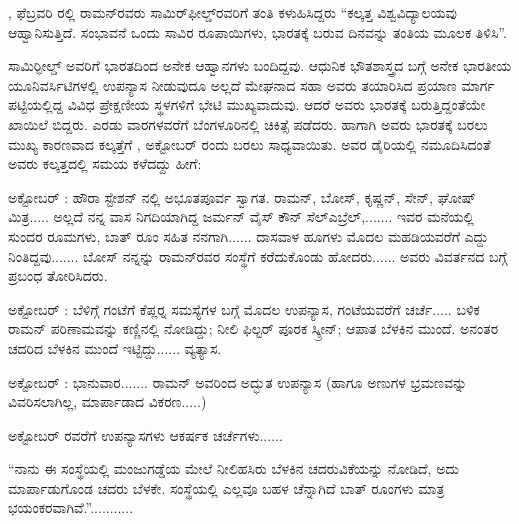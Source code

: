\vskip 2.5pt

, ಫೆಬ್ರವರಿ ರಲ್ಲಿ ರಾಮನ್‍ರವರು ಸಾಮಿರ್‌ಫೀಲ್ಡ್‌ರವರಿಗೆ ತಂತಿ ಕಳುಹಿಸಿದ್ದರು\enginline{-} “ಕಲ್ಕತ್ತ ವಿಶ್ವವಿದ್ಯಾಲಯವು ಆಹ್ವಾನಿಸುತ್ತಿದೆ. ಸಂಭಾವನೆ ಒಂದು ಸಾವಿರ ರೂಪಾಯಿಗಳು, ಭಾರತಕ್ಕೆ ಬರುವ ದಿನವನ್ನು ತಂತಿಯ ಮೂಲಕ ತಿಳಿಸಿ”.

\vskip 2.5pt

ಸಾಮಿರ್‍ಫೀಲ್ಡ್ ಅವರಿಗೆ ಭಾರತದಿಂದ ಅನೇಕ ಆಹ್ವಾನಗಳು ಬಂದಿದ್ದವು. ಆಧುನಿಕ ಭೌತಶಾಸ್ತ್ರದ ಬಗ್ಗೆ ಅನೇಕ ಭಾರತೀಯ ಯೂನಿವರ್ಸಿಟಿಗಳಲ್ಲಿ ಉಪನ್ಯಾಸ ನೀಡುವುದೂ ಅಲ್ಲದೆ ಮೇಘನಾದ ಸಹಾ ಅವರು ತಯಾರಿಸಿದ ಪ್ರಯಾಣ ಮಾರ್ಗ ಪಟ್ಟಿಯಲ್ಲಿದ್ದ ವಿವಿಧ ಪ್ರೇಕ್ಷಣೀಯ ಸ್ಥಳಗಳಿಗೆ ಭೇಟಿ ಮುಖ್ಯವಾದುವು. ಆದರೆ ಅವರು ಭಾರತಕ್ಕೆ ಬರುತ್ತಿದ್ದಂತೆಯೇ ಖಾಯಿಲೆ ಬಿದ್ದರು. ಎರಡು ವಾರಗಳವರೆಗೆ ಬೆಂಗಳೂರಿನಲ್ಲಿ ಚಿಕಿತ್ಸೆ ಪಡೆದರು. ಹಾಗಾಗಿ ಅವರು ಭಾರತಕ್ಕೆ ಬರಲು ಮುಖ್ಯ ಕಾರಣವಾದ ಕಲ್ಕತ್ತೆಗೆ , ಅಕ್ಟೋಬರ್ ರಂದು ಬರಲು ಸಾಧ್ಯವಾಯಿತು. ಅವರ ಡೈರಿಯಲ್ಲಿ ನಮೂದಿಸಿದಂತೆ ಅವರು ಕಲ್ಕತ್ತದಲ್ಲಿ ಸಮಯ ಕಳೆದದ್ದು ಹೀಗೆ:

\vskip 2.5pt

ಅಕ್ಟೋಬರ್ : ಹೌರಾ ಸ್ಟೇಶನ್ ನಲ್ಲಿ ಅಭೂತಪೂರ್ವ ಸ್ವಾಗತ. ರಾಮನ್, ಬೋಸ್, ಕೃಷ್ಣನ್, ಸೇನ್, ಘೋಷ್ ಮಿತ್ರ..... ಅಲ್ಲದೆ ನನ್ನ ವಾಸ ನಿಗದಿಯಾಗಿದ್ದ ಜರ್ಮನ್ ವೈಸ್ ಕೌನ್ ಸೆಲ್\break ಎಬ್ರೆಲ್,....... ಇವರ ಮನೆಯಲ್ಲಿ  ಸುಂದರ ರೂಮಗಳು, ಬಾತ್ ರೂಂ ಸಹಿತ ನನಗಾಗಿ...... ದಾಸವಾಳ ಹೂಗಳು ಮೊದಲ ಮಹಡಿಯವರೆಗೆ ಎದ್ದು ನಿಂತಿದ್ದವು....... ಬೋಸ್ ನನ್ನನ್ನು ರಾಮನ್‍ರವರ ಸಂಸ್ಥೆಗೆ ಕರೆದುಕೊಂಡು ಹೋದರು...... ಅವರು ವಿವರ್ತನದ ಬಗ್ಗೆ ಪ್ರಬಂಧ ತೋರಿಸಿದರು.

\vskip 2.5pt

ಅಕ್ಟೋಬರ್ : ಬೆಳಿಗ್ಗೆ  ಗಂಟೆಗೆ ಕೆಪ್ಲರ್‍ನ ಸಮಸ್ಯೆಗಳ ಬಗ್ಗೆ ಮೊದಲ ಉಪನ್ಯಾಸ,  ಗಂಟೆಯವರೆಗೆ ಚರ್ಚೆ..... ಬಳಿಕ ರಾಮನ್ ಪರಿಣಾಮವನ್ನು ಕಣ್ಣಿನಲ್ಲಿ ನೋಡಿದ್ದು; ನೀಲಿ ಫಿಲ್ಟರ್ ಪೂರಕ ಸ್ಕ್ರೀನ್; ಆಪಾತ ಬೆಳಕಿನ ಮುಂದೆ. ಅನಂತರ ಚದರಿದ ಬೆಳಕಿನ ಮುಂದೆ ಇಟ್ಟಿದ್ದು...... ವ್ಯತ್ಯಾಸ.

ಅಕ್ಟೋಬರ್ : ಭಾನುವಾರ....... ರಾಮನ್ ಅವರಿಂದ ಅದ್ಭುತ ಉಪನ್ಯಾಸ (ಹಾಗೂ ಅಣುಗಳ ಭ್ರಮಣವನ್ನು ವಿವರಿಸಲಾಗಿಲ್ಲ, ಮಾರ್ಪಾಡಾದ ವಿಕರಣ.....) 

ಅಕ್ಟೋಬರ್  ರವರೆಗೆ ಉಪನ್ಯಾಸಗಳು ಆಕರ್ಷಕ ಚರ್ಚೆಗಳು...... 

“ನಾನು ಈ ಸಂಸ್ಥೆಯಲ್ಲಿ ಮಂಜುಗಡ್ಡೆಯ ಮೇಲೆ ನೀಲಿ\enginline{-}ಹಸಿರು ಬೆಳಕಿನ ಚದರುವಿಕೆಯನ್ನು ನೋಡಿದೆ, ಅದು ಮಾರ್ಪಾಡುಗೊಂಡ ಚದರು ಬೆಳಕೇ. ಸಂಸ್ಥೆಯಲ್ಲಿ ಎಲ್ಲವೂ ಬಹಳ ಚೆನ್ನಾಗಿದೆ ಬಾತ್ ರೂಂಗಳು ಮಾತ್ರ ಭಯಂಕರವಾಗಿವೆ.”...........

